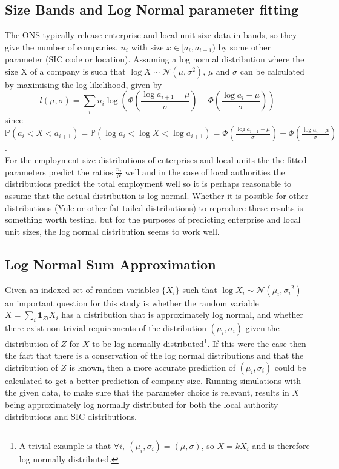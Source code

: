 \documentclass[a4paper,10pt]{article}
\begin{document}
\subsection{Size Bands and Log Normal parameter fitting}
The ONS typically release enterprise and local unit size data in bands, so they give the number of companies, $n_i$ with size $x \in [a_i, a_{i+1})$ by some other parameter (SIC code or location). Assuming a log normal distribution where the size X of a company is such that $\log X \sim \mathcal{N}(\mu, \sigma^2)$, $\mu$ and $\sigma$ can be calculated by maximising the log likelihood, given by
\begin{equation}
 l(\mu, \sigma) = \sum_i n_i \log \left( \Phi \left( \frac{\log a_{i + 1} - \mu}{\sigma} \right) - \Phi \left( \frac{\log a_{i} - \mu}{\sigma} \right) \right)
\end{equation}
since $\mathbb{P}(a_i < X < a_{i + 1}) = \mathbb{P}(\log a_i < \log X < \log a_{i + 1}) = \Phi \left( \frac{\log a_{i + 1} - \mu}{\sigma} \right) - \Phi \left( \frac{\log a_{i} - \mu}{\sigma} \right)$. \\
For the employment size distributions of enterprises and local units the the fitted parameters predict the ratios $\frac{n_i}{N}$ well and in the case of local authorities the distributions predict the total employment well so it is perhaps reasonable to assume that the actual distribution is log normal. Whether it is possible for other distributions (Yule or other fat tailed distributions) to reproduce these results is something worth testing, but for the purposes of predicting enterprise and local unit sizes, the log normal distribution seems to work well.

\subsection{Log Normal Sum Approximation}
Given an indexed set of random variables $\{X_i\}$ such that $\log X_i \sim \mathcal{N}(\mu_i, {\sigma_i}^2)$ an important question for this study is whether the random variable $X = \sum_i\mathbf{1}_{Zi}X_i$ has a distribution that is approximately log normal, and whether there exist non trivial requirements of the distribution ${(\mu_i, \sigma_i)}$ given the distribution of $Z$ for $X$ to be log normally distributed\footnote{A trivial example is that $\forall i, \ (\mu_i, \sigma_i) = (\mu, \sigma)$, so $X = kX_i$ and is therefore log normally distributed.}. If this were the case then the fact that there is a conservation of the log normal distributions and that the distribution of $Z$ is known, then a more accurate prediction of ${(\mu_i, \sigma_i)}$ could be calculated to get a better prediction of company size.
Running simulations with the given data, to make sure that the parameter choice is relevant, results in $X$ being approximately log normally distributed for both the local authority distributions and SIC distributions. %
\end{document}

